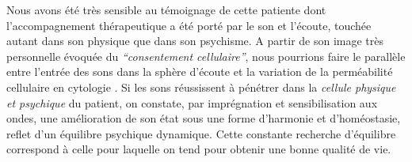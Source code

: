 Nous avons été très sensible au témoignage de cette patiente dont l'accompagnement thérapeutique a 
été porté par le son et l'écoute, touchée autant dans son physique que dans son psychisme.
A partir de son image très personnelle évoquée du \textit{``consentement cellulaire''}, nous pourrions 
faire le
parallèle entre l'entrée des sons dans la sphère d'écoute et la variation de la
perméabilité cellulaire en cytologie \cite{marieb:biologie}. Si les sons réussissent à pénétrer dans la
\textit{cellule physique et psychique} du patient,  on constate, par 
imprégnation et sensibilisation aux ondes,
une amélioration de son état %
sous une forme d'harmonie et d'homéostasie,  
\autocite[10]{marieb:biologie} 
reflet d'un équilibre psychique dynamique.  
Cette  constante recherche d'équilibre 
correspond  à celle pour laquelle on tend pour obtenir  une bonne qualité de vie.

